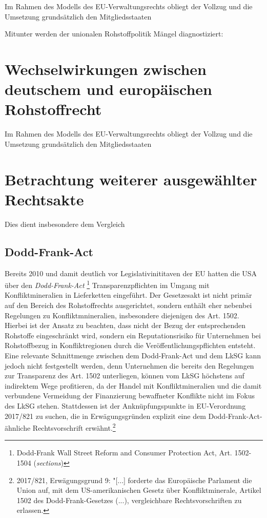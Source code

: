 \documentclass[12pt,a4paper,oneside]{book} %
\begin{document}
Im Rahmen des Modells des EU-Verwaltungsrechts obliegt der Vollzug und die Umsetzung grundsätzlich den Mitgliedsstaaten


Mitunter werden der unionalen Rohstoffpolitik Mängel diagnostiziert: 

\section{Wechselwirkungen zwischen deutschem und europäischen Rohstoffrecht}
Im Rahmen des Modells des EU-Verwaltungsrechts obliegt der Vollzug und die Umsetzung grundsätzlich den Mitgliedsstaaten

\section{Betrachtung weiterer ausgewählter Rechtsakte}

Dies dient insbesondere dem Vergleich 

\subsection{Dodd-Frank-Act}
Bereits 2010 und damit deutlich vor Legislativinititaven der EU hatten die USA über den \textit{Dodd-Frank-Act} \footnote{Dodd-Frank Wall Street Reform and Consumer Protection Act, Art. 1502-1504 (\textit{sections})} Transparenzpflichten im Umgang mit Konfliktmineralien in Lieferketten eingeführt. Der Gesetzesakt ist nicht primär auf den Bereich des Rohstoffrechts ausgerichtet, sondern enthält eher nebenbei Regelungen zu Konfliktmnineralien, insbesondere diejenigen des Art. 1502.  Hierbei ist der Ansatz zu beachten, dass nicht der Bezug der entsprechenden Rohstoffe eingeschränkt wird, sondern ein Reputationsrisiko für Unternehmen bei Rohstoffbezug in Konfliktregionen durch die Veröffentlichungspflichten entsteht.\autocite[Rn. 415]{ruttloff_lieferkettensorgfaltspflichtengesetz_2022} Eine relevante Schnittmenge zwischen dem Dodd-Frank-Act und dem LkSG kann jedoch nicht festgestellt werden, denn Unternehmen die bereits den Regelungen zur Transparenz des Art. 1502 unterliegen, können vom LkSG höchstens auf indirektem Wege profitieren, da der Handel mit Konfliktmineralien und die damit verbundene Vermeidung der Finanzierung bewaffneter Konflikte nicht im Fokus des LkSG stehen.\autocite[Rn 423]{ruttloff_lieferkettensorgfaltspflichtengesetz_2022} Stattdessen ist der Anknüpfungspunkte in EU-Verordnung 2017/821 zu suchen, die in Erwägungsgründen explizit eine dem Dodd-Frank-Act-ähnliche Rechtsvorschrift erwähnt.\footnote{2017/821, Erwägungsgrund 9: "[...] forderte das Europäische Parlament die Union auf, mit dem US-amerikanischen Gesetz über Konfliktminerale, Artikel 1502 des Dodd-Frank-Gesetzes (...), vergleichbare Rechtsvorschriften zu erlassen.} 
\end{document}
